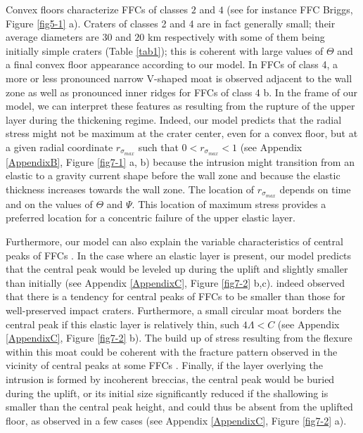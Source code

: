 \begin{article}
        Convex floors  characterize FFCs of  classes $2$ and  $4$ (see
        for instance  FFC Briggs,  Figure \ref{fig5-1} a).  Craters of
        classes 2  and 4  are in fact  generally small;  their average
        diameters    are    $30$     and    $20$    km    respectively
        \citep{Jozwiak2012} with  some of them being  initially simple
        craters (Table \ref{tab1}); this is coherent with large values
        of $\Theta$ and  a final convex floor  appearance according to
        our  model. In  FFCs of  class 4,  a more  or less  pronounced
        narrow V-shaped moat is observed  adjacent to the wall zone as
        well as pronounced inner ridges for  FFCs of class 4 b. In the
        frame  of  our  model,  we can  interpret  these  features  as
        resulting  from the  rupture  of the  upper  layer during  the
        thickening regime. Indeed, our  model predicts that the radial
        stress might not  be maximum at the crater center,  even for a
        convex   floor,    but   at   a   given    radial   coordinate
        $r_{\sigma_{max}}$   such  that   $0<r_{\sigma_{max}}<1$  (see
        Appendix  \ref{AppendixB}, Figure  \ref{fig7-1} a,  b) because
        the intrusion  might transition from  an elastic to  a gravity
        current shape  before the  wall zone  and because  the elastic
        thickness  increases towards  the wall  zone. The  location of
        $r_{\sigma_{max}}$  depends  on  time  and on  the  values  of
        $\Theta$ and $\Psi$. This  location of maximum stress provides
        a preferred  location for  a concentric  failure of  the upper
        elastic layer.
	 
        Furthermore,  our   model  can   also  explain   the  variable
        characteristics     of      central     peaks      of     FFCs
        \citep{Schultz1976}.  In the  case where  an elastic  layer is
        present, our  model predicts  that the  central peak  would be
        leveled  up  during  the  uplift  and  slightly  smaller  than
        initially (see  Appendix \ref{AppendixC},  Figure \ref{fig7-2}
        b,c).  \citet{Schultz1976} indeed  observed  that  there is  a
        tendency for  central peaks of  FFCs to be smaller  than those
        for  well-preserved  impact   craters.  Furthermore,  a  small
        circular moat borders  the central peak if  this elastic layer
        is   relatively   thin,   such  $4\Lambda<C$   (see   Appendix
        \ref{AppendixC},  Figure  \ref{fig7-2}  b). The  build  up  of
        stress resulting  from the flexure  within this moat  could be
        coherent with the fracture pattern observed in the vicinity of
        central peaks  at some  FFCs \citep{Schultz1976}.  Finally, if
        the  layer overlying  the  intrusion is  formed by  incoherent
        breccias, the central peak would  be buried during the uplift,
        or its initial size significantly reduced if the shallowing is
        smaller than the central peak height, and could thus be absent
        from  the  uplifted   floor,  as  observed  in   a  few  cases
        \citep{Schultz1976}  (see   Appendix  \ref{AppendixC},  Figure
        \ref{fig7-2} a).
		 

\end{article}
